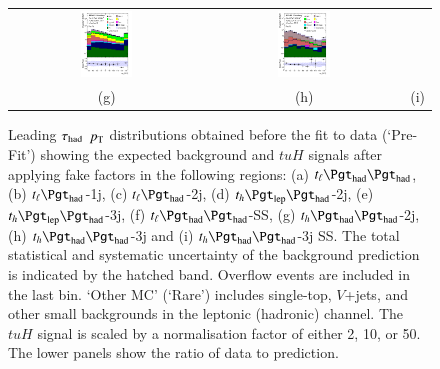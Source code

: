 \begin{figure}[H]
\begin{tabular}{@{}ccc@{}}
\includegraphics[page=1,width=0.28\textwidth]{figures/new_pt/log_or_nolog/tuH_reg2mtau1b3jos_log_.pdf}&
\includegraphics[page=1,width=0.28\textwidth]{figures/new_pt/log_or_nolog/tuH_reg2mtau1b3jss_log_.pdf}\\
(g) & (h) & (i)\\
\end{tabular}
\caption{Leading $\tau_\text{had}$ $p_{\text{T}}$  distributions obtained before the fit to data (`Pre-Fit') showing 
  the expected background and $tuH$ signals after applying fake factors in the following regions: (a) $t_{\ell}\thadhad$,
 (b) $t_{\ell}\tauhad$-1j,  (c) $t_{\ell}\tauhad$-2j, (d) $t_h\tlhad$-2j, (e) $t_h\tlhad$-3j, (f) $t_{\ell}\thadhad$-SS, (g) $t_h\thadhad$-2j, (h) $t_h\thadhad$-3j and (i) $t_h\thadhad$-3j SS.
 The total statistical and systematic uncertainty of the background prediction is indicated by the hatched band.
 Overflow events are included in the last bin. `Other MC' (`Rare') includes single-top, $V$+jets, and other small backgrounds in the leptonic (hadronic) channel. The $tuH$ signal is scaled by a
 normalisation factor of either 2, 10, or 50.   
The lower panels show the ratio of data to prediction.}
\label{fig:taupt_prefit}
\end{figure}




